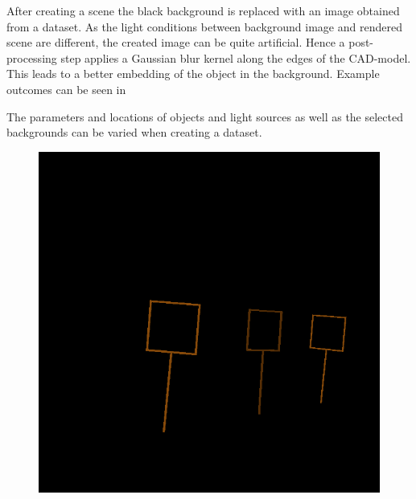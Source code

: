 After creating a scene the black background is replaced with an image obtained from a dataset. As the light conditions between background image and rendered scene are different, the created image can be quite artificial. Hence a post-processing step applies a Gaussian blur kernel along the edges of the CAD-model. This leads to a better embedding of the object in the background. Example outcomes can be seen in 

The parameters and locations of objects and light sources as well as the selected backgrounds can be varied when creating a dataset.

\begin{figure}[hbtp]
	\centering
	\begin{minipage}{0.49\textwidth}
		\includegraphics[width=\textwidth]{fig/shot}
	\end{minipage}
	\begin{minipage}{0.49\textwidth}

\end{minipage}
\end{figure}
